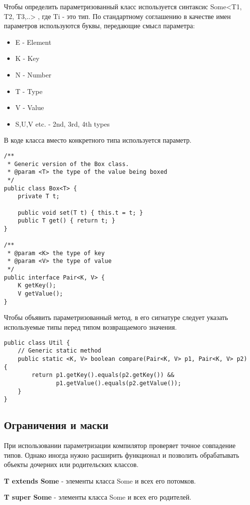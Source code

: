 \documentclass[a4paper,12pt]{extreport}
\begin{document}
Чтобы определить параметризованный класс используется синтаксис Some<T1, T2, T3,..> , где Ti - это тип. По стандартному соглашению в качестве имен параметров используются буквы, передающие смысл параметра:
\begin{itemize}
    \item E - Element
    \item K - Key
    \item N - Number
    \item T - Type
    \item V - Value
    \item S,U,V etc. - 2nd, 3rd, 4th types
\end{itemize}

В коде класса вместо конкретного типа используется параметр.
\begin{lstlisting}
/**
 * Generic version of the Box class.
 * @param <T> the type of the value being boxed
 */
public class Box<T> {
    private T t;

    public void set(T t) { this.t = t; }
    public T get() { return t; }
}

/**
 * @param <K> the type of key 
 * @param <V> the type of value
 */
public interface Pair<K, V> {
    K getKey();
    V getValue();
}
\end{lstlisting}

Чтобы объявить параметризованный метод, в его сигнатуре следует указать используемые типы перед типом возвращаемого значения. 

\begin{lstlisting}
public class Util {
    // Generic static method
    public static <K, V> boolean compare(Pair<K, V> p1, Pair<K, V> p2) {
        return p1.getKey().equals(p2.getKey()) &&
               p1.getValue().equals(p2.getValue());
    }
}
\end{lstlisting}

\subsection*{Ограничения и маски}
При использовании параметризации компилятор проверяет точное совпадение типов. Однако иногда нужно расширить функционал и позволить обрабатывать объекты дочерних или родительских классов. 


\textbf{T extends Some} - элементы класса Some и всех его потомков. 

\textbf{T super Some} - элементы класса Some и всех его родителей.
\end{document}
